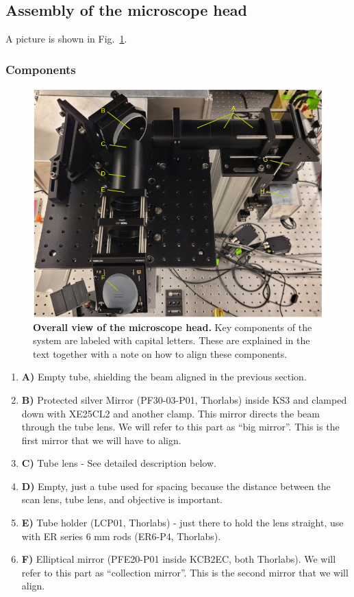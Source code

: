 \documentclass[10pt,letterpaper]{article}
\begin{document}
\subsection{Assembly of the microscope head}
%
A picture is shown in Fig.~\ref{sfig5}.
\subsubsection{Components}
%
\begin{figure}[t!]
    \includegraphics[width=\textwidth]{sfig5.jpg}
    \caption{{\bf Overall view of the microscope head.} Key components of the system are labeled with capital letters. These are explained in the text together with a note on how to align these components.}
    \label{sfig5}
\end{figure}
%
\begin{enumerate}[]
    \item \textbf{A)} Empty tube, shielding the beam aligned in the previous section.
    \item \textbf{B)} Protected silver Mirror (PF30-03-P01, Thorlabs) inside KS3 and clamped down with XE25CL2 and another clamp. This mirror directs the beam through the tube lens. We will refer to this part as ``big mirror''. This is the first mirror that we will have to align.
    \item \textbf{C)} Tube lens - See detailed description below.
    \item \textbf{D)} Empty, just a tube used for spacing because the distance between the scan lens, tube lens, and objective is important.
    \item \textbf{E)} Tube holder (LCP01, Thorlabs) - just there to hold the lens straight, use with ER series 6 mm rods (ER6-P4, Thorlabs).
    \item \textbf{F)} Elliptical mirror (PFE20-P01 inside KCB2EC, both Thorlabs). We will refer to this part as ``collection mirror''. This is the second mirror that we will align.
\end{enumerate}
%
%
\end{document}
